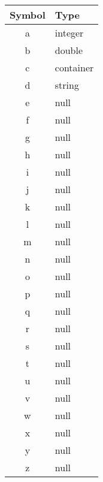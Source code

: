 \begin{tabular}{|c|l|}
\hline
Symbol & Type \\ \hline
a & integer \\ \hline
b & double \\ \hline
c & container \\ \hline
d & string \\ \hline
e & null \\ \hline
f & null \\ \hline
g & null \\ \hline
h & null \\ \hline
i & null \\ \hline
j & null \\ \hline
k & null \\ \hline
l & null \\ \hline
m & null \\ \hline
n & null \\ \hline
o & null \\ \hline
p & null \\ \hline
q & null \\ \hline
r & null \\ \hline
s & null \\ \hline
t & null \\ \hline
u & null \\ \hline
v & null \\ \hline
w & null \\ \hline
x & null \\ \hline
y & null \\ \hline
z & null \\ \hline
\end{tabular}